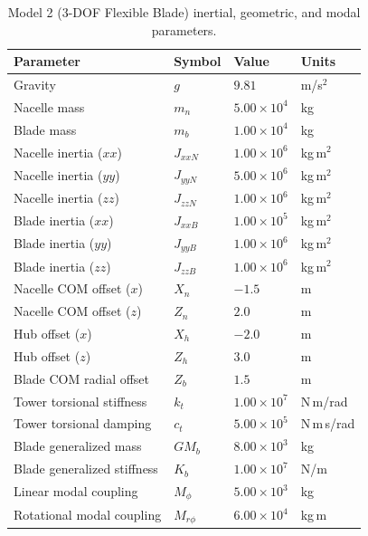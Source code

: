 \documentclass[final,onecolumn]{IEEEtran}
\begin{document}
\begin{table}[H]
    \centering
    \caption{Model 2 (3-DOF Flexible Blade) inertial, geometric, and modal parameters.}
    \label{tab:model2_params}
    \begin{tabular}{llll}
        \hline
        Parameter                   & Symbol      & Value              & Units       \\
        \hline
        Gravity                     & $g$         & $9.81$             & m/s$^2$     \\
        Nacelle mass                & $m_n$       & $5.00 \times 10^4$ & kg          \\
        Blade mass                  & $m_b$       & $1.00 \times 10^4$ & kg          \\
        Nacelle inertia ($xx$)      & $J_{xxN}$   & $1.00 \times 10^6$ & kg\,m$^2$   \\
        Nacelle inertia ($yy$)      & $J_{yyN}$   & $5.00 \times 10^6$ & kg\,m$^2$   \\
        Nacelle inertia ($zz$)      & $J_{zzN}$   & $1.00 \times 10^6$ & kg\,m$^2$   \\
        Blade inertia ($xx$)        & $J_{xxB}$   & $1.00 \times 10^5$ & kg\,m$^2$   \\
        Blade inertia ($yy$)        & $J_{yyB}$   & $1.00 \times 10^6$ & kg\,m$^2$   \\
        Blade inertia ($zz$)        & $J_{zzB}$   & $1.00 \times 10^6$ & kg\,m$^2$   \\
        Nacelle COM offset ($x$)    & $X_n$       & $-1.5$             & m           \\
        Nacelle COM offset ($z$)    & $Z_n$       & $2.0$              & m           \\
        Hub offset ($x$)            & $X_h$       & $-2.0$             & m           \\
        Hub offset ($z$)            & $Z_h$       & $3.0$              & m           \\
        Blade COM radial offset     & $Z_b$       & $1.5$              & m           \\
        Tower torsional stiffness   & $k_t$       & $1.00 \times 10^7$ & N\,m/rad    \\
        Tower torsional damping     & $c_t$       & $5.00 \times 10^5$ & N\,m\,s/rad \\
        Blade generalized mass      & $GM_b$      & $8.00 \times 10^3$ & kg          \\
        Blade generalized stiffness & $K_b$       & $1.00 \times 10^7$ & N/m         \\
        Linear modal coupling       & $M_\phi$    & $5.00 \times 10^3$ & kg          \\
        Rotational modal coupling   & $M_{r\phi}$ & $6.00 \times 10^4$ & kg\,m       \\
        \hline
    \end{tabular}
\end{table}
\end{document}
